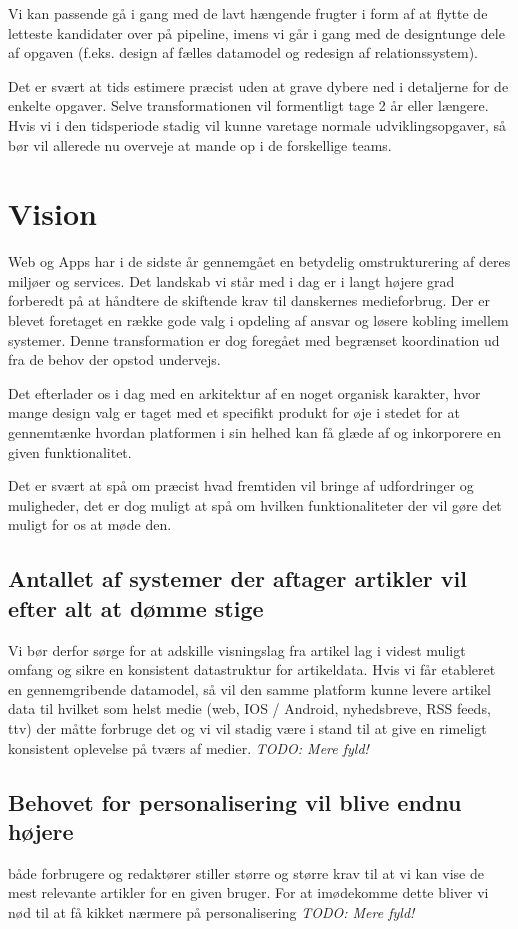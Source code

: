 \documentclass{article}
\begin{document}
Vi kan passende gå i gang med de lavt hængende frugter i form af at flytte de letteste kandidater over på pipeline, imens vi går i gang med de designtunge dele af opgaven (f.eks. design af fælles datamodel og redesign af relationssystem).

Det er svært at tids estimere præcist uden at grave dybere ned i detaljerne for de enkelte opgaver. Selve transformationen vil formentligt tage 2 år eller længere. Hvis vi i den tidsperiode stadig vil kunne varetage normale udviklingsopgaver, så bør vil allerede nu overveje at mande op i de forskellige teams.

\section{Vision}
Web og Apps har i de sidste år gennemgået en betydelig omstrukturering af deres miljøer og services. Det landskab vi står med i dag er i langt højere grad forberedt på at håndtere de skiftende krav til danskernes medieforbrug. Der er blevet foretaget en række gode valg i opdeling af ansvar og løsere kobling imellem systemer. Denne transformation er dog foregået med begrænset koordination ud fra de behov der opstod undervejs. 

Det efterlader os i dag med en arkitektur af en noget organisk karakter, hvor mange design valg er taget med et specifikt produkt for øje i stedet for at gennemtænke hvordan platformen i sin helhed kan få glæde af og inkorporere en given funktionalitet.

Det er svært at spå om præcist hvad fremtiden vil bringe af udfordringer og muligheder, det er dog muligt at spå om hvilken funktionaliteter der vil gøre det muligt for os at møde den.  

\subsection{Antallet af systemer der aftager artikler vil efter alt at dømme stige}
Vi bør derfor sørge for at adskille visningslag fra artikel lag i videst muligt omfang og sikre en konsistent datastruktur for artikeldata. Hvis vi får etableret en gennemgribende datamodel, så vil den samme platform kunne levere artikel data til hvilket som helst medie (web, IOS / Android, nyhedsbreve, RSS feeds, ttv) der måtte forbruge det og vi vil stadig være i stand til at give en rimeligt konsistent oplevelse på tværs af medier.
    \textit{TODO: Mere fyld!}
\subsection{Behovet for personalisering vil blive endnu højere}
både forbrugere og redaktører stiller større og større krav til at vi kan vise de mest relevante artikler for en given bruger. For at imødekomme dette bliver vi nød til at få kikket nærmere på personalisering
    \textit{TODO: Mere fyld!}
\end{document}
